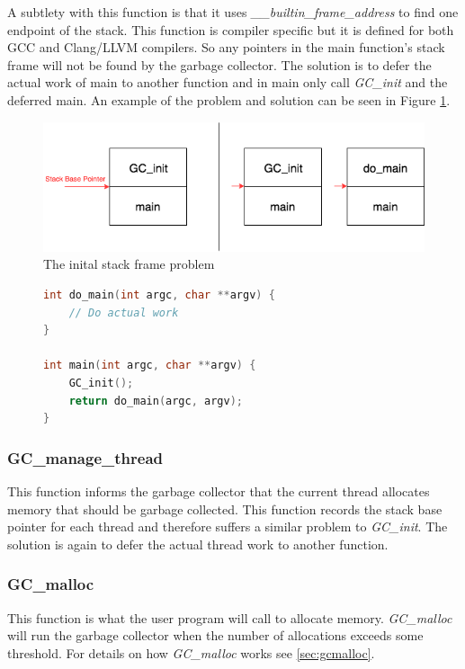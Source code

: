 \documentclass[../diss.tex]{subfiles}
\begin{document}
A subtlety with this function is that it uses \emph{\_\_builtin\_frame\_address} to find one endpoint of the stack. This function is compiler specific but it is defined for both GCC and Clang/LLVM compilers. So any pointers in the main function's stack frame will not be found by the garbage collector. The solution is to defer the actual work of main to another function and in main only call \emph{GC\_init} and the deferred main. An example of the problem and solution can be seen in Figure \ref{fig:stackproblem}.

\begin{figure}
    \centering
    \includegraphics[max width=\linewidth]{figs/stackproblem.png}
    \caption{The inital stack frame problem}
    \label{fig:stackproblem}
\end{figure}

\begin{figure}
\begin{lstlisting}[language=C, caption=Solution to the stack frame problem, label={lst:stackframeproblem}]
int do_main(int argc, char **argv) {
    // Do actual work
}

int main(int argc, char **argv) {
    GC_init();
    return do_main(argc, argv);
}
\end{lstlisting}
\end{figure}

\subsubsection{GC\_manage\_thread}
This function informs the garbage collector that the current thread allocates memory that should be garbage collected. This function records the stack base pointer for each thread and therefore suffers a similar problem to \emph{GC\_init}. The solution is again to defer the actual thread work to another function.

\subsubsection{GC\_malloc}
This function is what the user program will call to allocate memory. \emph{GC\_malloc} will run the garbage collector when the number of allocations exceeds some threshold. For details on how \emph{GC\_malloc} works see \cref{sec:gcmalloc}.
\end{document}
